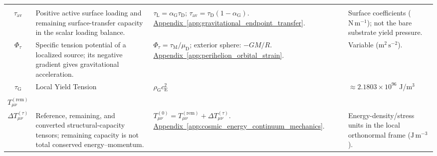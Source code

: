\begin{longtable}{@{} c p{5.5cm} p{4cm} p{3.5cm} @{}}
\begin{tabular}[c]{@{}c@{}}$\tau_{\mathrm L}$ \\ $\tau_{\mathrm{av}}$\end{tabular} & {\raggedright Positive active surface loading and remaining surface-transfer capacity in the scalar loading balance.\par} & {\raggedright $\tau_{\mathrm L}=\alpha_{\mathrm G}\tau_{\mathrm D}$; $\tau_{\mathrm{av}}=\tau_{\mathrm D}(1-\alpha_{\mathrm G})$. \newline \hyperref[app:gravitational_endpoint_transfer]{Appendix~\ref*{app:gravitational_endpoint_transfer}}.\par} & {\raggedright Surface coefficients ($\mathrm{N\,m^{-1}}$); not the bare substrate yield pressure.\par} \\

$\Phi_\tau$ & {\raggedright Specific tension potential of a localized source; its negative gradient gives gravitational acceleration.\par} & {\raggedright $\Phi_\tau=\tau_{\mathrm M}/\mu_{\mathrm D}$; exterior sphere: $-GM/R$. \newline \hyperref[app:perihelion_orbital_strain]{Appendix~\ref*{app:perihelion_orbital_strain}}.\par} & {\raggedright Variable ($\mathrm{m^2\,s^{-2}}$).\par} \\


$\tau_{\mathrm{G}}$ & Local Yield Tension & $\rho_{\mathrm{G}} c_{\mathrm{E}}^2$ & $\approx 2.1803 \times 10^{96}$ J/m$^3$ \\

\begin{tabular}[c]{@{}c@{}}$T_{\mu\nu}^{(0)}$ \\ $T_{\mu\nu}^{(\mathrm{rem})}$ \\ $\Delta T_{\mu\nu}^{(\tau)}$\end{tabular} & {\raggedright Reference, remaining, and converted structural-capacity tensors; remaining capacity is not total conserved energy--momentum.\par} & {\raggedright $T_{\mu\nu}^{(0)}=T_{\mu\nu}^{(\mathrm{rem})}+\Delta T_{\mu\nu}^{(\tau)}$. \newline \hyperref[app:cosmic_energy_continuum_mechanics]{Appendix~\ref*{app:cosmic_energy_continuum_mechanics}}.\par} & {\raggedright Energy-density/stress units in the local orthonormal frame ($\mathrm{J\,m^{-3}}$).\par} \\


\end{longtable}
